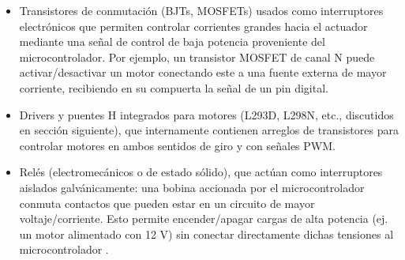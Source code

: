 \begin{itemize}
    \item Transistores de conmutación (BJTs, MOSFETs) usados como interruptores electrónicos que permiten controlar corrientes grandes hacia el actuador mediante una señal de control de baja potencia proveniente del microcontrolador. Por ejemplo, un transistor MOSFET de canal N puede activar/desactivar un motor conectando este a una fuente externa de mayor corriente, recibiendo en su compuerta la señal de un pin digital.
    \item Drivers y puentes H integrados para motores (L293D, L298N, etc., discutidos en sección siguiente), que internamente contienen arreglos de transistores para controlar motores en ambos sentidos de giro y con señales PWM.
    \item Relés (electromecánicos o de estado sólido), que actúan como interruptores aislados galvánicamente: una bobina accionada por el microcontrolador conmuta contactos que pueden estar en un circuito de mayor voltaje/corriente. Esto permite encender/apagar cargas de alta potencia (ej. un motor alimentado con 12 V) sin conectar directamente dichas tensiones al microcontrolador \cite{Smoot2023Reles}.
\end{itemize}


